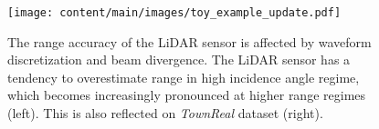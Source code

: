 \begin{figure}[t]
\centering
\texttt{[image: content/main/images/toy\_example\_update.pdf]}
\caption{The range accuracy of the LiDAR sensor is affected by waveform discretization and beam divergence. %
The LiDAR sensor has a tendency to overestimate range in high incidence angle regime, which becomes increasingly pronounced at higher range regimes (left). This is also reflected on \textit{TownReal} dataset (right).}
\label{fig:toy_example}
\end{figure}